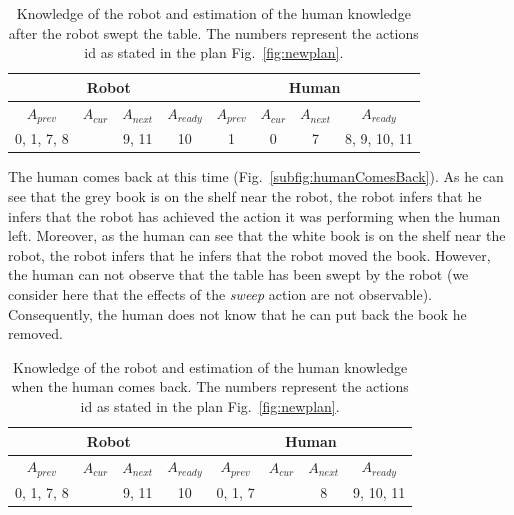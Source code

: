 \documentclass[english,a4paper,11pt,twoside]{StyleThese}
\begin{document}
\begin{table}[!h]
\begin{center}
\begin{tabular}{|c|c|c|c||c|c|c|c|}
\hline
\multicolumn{4}{|c||}{Robot} & \multicolumn{4}{c|}{Human}\\
\hline
$A_{prev}$ & $A_{cur}$ & $A_{next}$ & $A_{ready}$ & $A_{prev}$ & $A_{cur}$ & $A_{next}$ & $A_{ready}$\\
\hline
\hline
0, 1, 7, 8  &  & 9, 11 & 10 & 1 & 0 & 7 & 8, 9, 10, 11\\
\hline
\end{tabular}
\end{center}
\caption{Knowledge of the robot and estimation of the human knowledge after the robot swept the table. The numbers represent the actions id as stated in the plan Fig.~\ref{fig:newplan}.}
\label{table:results}
\end{table}

The human comes back at this time (Fig.~\ref{subfig:humanComesBack}). As he can see that the grey book is on the shelf near the robot, the robot infers that he infers that the robot has achieved the action it was performing when the human left. Moreover, as the human can see that the white book is on the shelf near the robot, the robot infers that he infers that the robot moved the book. However, the human can not observe that the table has been swept by the robot (we consider here that the effects of the \textit{sweep} action are not observable). Consequently, the human does not know that he can put back the book he removed.

\begin{table}[!h]
\begin{center}
\begin{tabular}{|c|c|c|c||c|c|c|c|}
\hline
\multicolumn{4}{|c||}{Robot} & \multicolumn{4}{c|}{Human}\\
\hline
$A_{prev}$ & $A_{cur}$ & $A_{next}$ & $A_{ready}$ & $A_{prev}$ & $A_{cur}$ & $A_{next}$ & $A_{ready}$\\
\hline
\hline
0, 1, 7, 8  &  & 9, 11 & 10 & 0, 1, 7 &  & 8 & 9, 10, 11\\
\hline
\end{tabular}
\end{center}
\caption{Knowledge of the robot and estimation of the human knowledge when the human comes back. The numbers represent the actions id as stated in the plan Fig.~\ref{fig:newplan}.}
\label{table:results}
\end{table}
\end{document}

